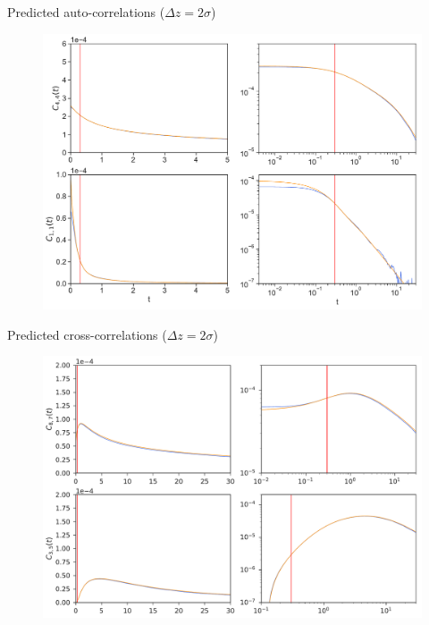\documentclass{beamer}
\begin{document}
\begin{frame}{Predicted auto-correlations ($\Delta z=2\sigma$)}
\begin{figure}[h!]
\includegraphics[width=\linewidth]{Predictions-WALLS-17nodes-defense}
\end{figure}
\end{frame}

\begin{frame}{Predicted cross-correlations ($\Delta z=2\sigma$)}
\begin{figure}[h!]
\includegraphics[width=\linewidth]{PredictionsCross-WALLS-17nodes}
\end{figure}
\end{frame}
  
\end{document}

